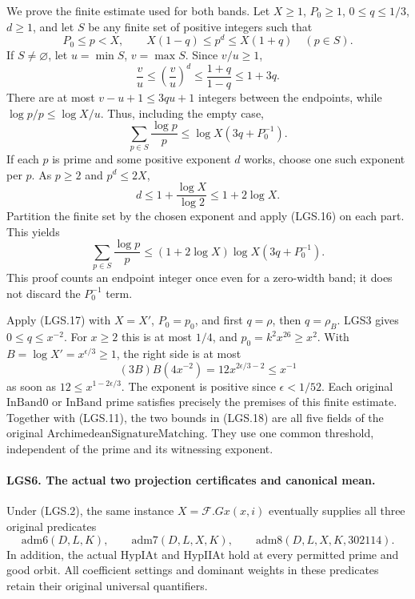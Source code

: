 We prove the finite estimate used for both bands.  Let
\(X\ge1\), \(P_0\ge1\), \(0\le q\le1/3\), \(d\ge1\), and
let \(S\) be any finite set of positive integers such that
\[
 P_0\le p<X,\qquad X(1-q)\le p^d\le X(1+q)
                       \quad(p\in S).
 \]
If \(S\ne\varnothing\), let \(u=\min S\), \(v=\max S\).
Since \(v/u\ge1\),
\[
 \frac vu\le\left(\frac vu\right)^d
       \le\frac{1+q}{1-q}\le1+3q.
 \]
There are at most \(v-u+1\le3qu+1\) integers between the
endpoints, while \(\log p/p\le\log X/u\).
Thus, including the empty case,
\[
             \sum_{p\in S}\frac{\log p}{p}
                 \le\log X(3q+P_0^{-1}).             \tag{LGS.16}
\]
If each \(p\) is prime and some positive exponent \(d\) works,
choose one such exponent per \(p\).  As \(p\ge2\) and
\(p^d\le2X\),
\[
       d\le1+\frac{\log X}{\log2}\le1+2\log X.
 \]
Partition the finite set by the chosen exponent and apply
(LGS.16) on each part.  This yields
\[
 \sum_{p\in S}\frac{\log p}{p}
       \le(1+2\log X)\log X(3q+P_0^{-1}).             \tag{LGS.17}
\]
This proof counts an endpoint integer once even for a
zero-width band; it does not discard the \(P_0^{-1}\) term.

Apply (LGS.17) with \(X=X'\), \(P_0=p_0\), and first
\(q=\rho\), then \(q=\rho_B\).  LGS3 gives
\(0\le q\le x^{-2}\).  For \(x\ge2\) this is at most \(1/4\),
and \(p_0=k^2x^{26}\ge x^2\).  With
\(B=\log X'=x^{\epsilon/3}\ge1\), the right side is at most
\[
       (3B)B(4x^{-2})=12x^{2\epsilon/3-2}\le x^{-1}
                                                               \tag{LGS.18}
\]
as soon as \(12\le x^{1-2\epsilon/3}\).
The exponent is positive since \(\epsilon<1/52\).
Each original \(\mathrm{InBand0}\) or \(\mathrm{InBand}\)
prime satisfies precisely the premises of this finite
estimate.  Together with (LGS.11), the two bounds in
(LGS.18) are all five fields of the original
\(\mathrm{ArchimedeanSignatureMatching}\).
They use one common threshold, independent of the prime
and its witnessing exponent.

\paragraph{LGS6. The actual two projection certificates and canonical mean.}
\label{claim:LGS6}
Under (LGS.2), the same instance \(X=\mathcal F.Gx(x,i)\)
eventually supplies all three original predicates
\[
 \mathrm{adm6}(D,L,K),\qquad
 \mathrm{adm7}(D,L,X,K),\qquad
 \mathrm{adm8}(D,L,X,K,302114).                         \tag{LGS.19}
\]
In addition, the actual \(\mathrm{HypIAt}\) and
\(\mathrm{HypIIAt}\) hold at every permitted prime and good
orbit.  All coefficient settings and dominant weights in
these predicates retain their original universal quantifiers.

